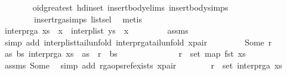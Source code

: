 \begin{isabellebody}
\ \ \ \ \ \ \isamarkupfalse%
\ oid{\isacharunderscore}greatest\ hd{\isacharunderscore}in{\isacharunderscore}set\ insert{\isacharunderscore}body{\isachardot}elims\ insert{\isacharunderscore}body{\isachardot}simps{\isacharparenleft}{}{\isacharparenright}\isanewline
\ \ \ \ \ \ \ \ insert{\isacharunderscore}rga{\isachardot}simps{\isacharparenleft}{}{\isacharparenright}\ list{\isachardot}sel{\isacharparenleft}{}{\isacharparenright}\ \isamarkupfalse%
\ metis\isanewline
\ \ \ \ \isamarkupfalse%
\ \isamarkupfalse%
\ {\isachardoublequoteopen}interp{\isacharunderscore}rga\ {\isacharparenleft}xs\ {\isacharat}\ {\isacharbrackleft}x{\isacharbrackright}{\isacharparenright}\ {\isacharequal}\ interp{\isacharunderscore}list\ {\isacharparenleft}ys\ {\isacharat}\ {\isacharbrackleft}x{\isacharbrackright}{\isacharparenright}{\isachardoublequoteclose}\ \isanewline
\ \ \ \ \ \ \isamarkupfalse%
\ assms{\isacharparenleft}{}{\isacharparenright}\ \isamarkupfalse%
\ {\isacharparenleft}simp\ add{\isacharcolon}\ interp{\isacharunderscore}list{\isacharunderscore}tail{\isacharunderscore}unfold\ interp{\isacharunderscore}rga{\isacharunderscore}tail{\isacharunderscore}unfold\ x{\isacharunderscore}pair{\isacharparenright}\isanewline
\ \ \isamarkupfalse%
\isanewline
\ \ \ \ \isamarkupfalse%
\ {\isacharparenleft}Some\ r{\isacharparenright}\isanewline
\ \ \ \ \isamarkupfalse%
\ {\isachardoublequoteopen}{\isasymexists}as\ bs{\isachardot}\ interp{\isacharunderscore}rga\ xs\ {\isacharequal}\ as\ {\isacharat}\ r\ {\isacharhash}\ bs{\isachardoublequoteclose}\isanewline
\ \ \ \ \isamarkupfalse%
\ {\isacharminus}\isanewline
\ \ \ \ \ \ \isamarkupfalse%
\ {\isachardoublequoteopen}r\ {\isasymin}\ set\ {\isacharparenleft}map\ fst\ xs{\isacharparenright}{\isachardoublequoteclose}\isanewline
\ \ \ \ \ \ \ \ \isamarkupfalse%
\ assms{\isacharparenleft}{}{\isacharparenright}\ Some\ \isamarkupfalse%
\ {\isacharparenleft}simp\ add{\isacharcolon}\ rga{\isacharunderscore}ops{\isacharunderscore}ref{\isacharunderscore}exists\ x{\isacharunderscore}pair{\isacharparenright}\isanewline
\ \ \ \ \ \ \isamarkupfalse%
\ {\isachardoublequoteopen}r\ {\isasymin}\ set\ {\isacharparenleft}interp{\isacharunderscore}rga\ xs{\isacharparenright}{\isachardoublequoteclose}\isanewline
\ \ \ \ \ \ \ \ \isamarkupfalse%

\end{isabellebody}
